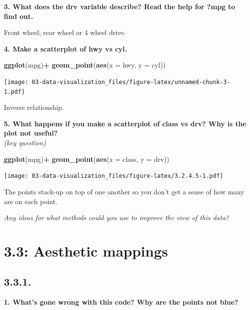 \documentclass[]{book}
\newenvironment{Shaded}{\begin{snugshade}}{\end{snugshade}}
\newcommand{\DataTypeTok}[1]{\textcolor[rgb]{0.13,0.29,0.53}{#1}}
\newcommand{\KeywordTok}[1]{\textcolor[rgb]{0.13,0.29,0.53}{\textbf{#1}}}
\newcommand{\NormalTok}[1]{#1}
\newcommand{\OperatorTok}[1]{\textcolor[rgb]{0.81,0.36,0.00}{\textbf{#1}}}
\newcommand{\StringTok}[1]{\textcolor[rgb]{0.31,0.60,0.02}{#1}}
\theoremstyle{definition}
\theoremstyle{definition}
\theoremstyle{definition}
\theoremstyle{remark}
\begin{document}
\textbf{3. What does the drv variable describe? Read the help for ?mpg
to find out.}

Front wheel, rear wheel or 4 wheel drive.

\textbf{4. Make a scatterplot of hwy vs cyl.}

\begin{Shaded}
\begin{Highlighting}[]
\KeywordTok{ggplot}\NormalTok{(mpg)}\OperatorTok{+}
\StringTok{  }\KeywordTok{geom_point}\NormalTok{(}\KeywordTok{aes}\NormalTok{(}\DataTypeTok{x =}\NormalTok{ hwy, }\DataTypeTok{y =}\NormalTok{ cyl))}
\end{Highlighting}
\end{Shaded}

\texttt{[image: 03-data-visualization\_files/figure-latex/unnamed-chunk-3-1.pdf]}

Inverse relationship.

\textbf{5. What happens if you make a scatterplot of class vs drv? Why
is the plot not useful?}\\
\emph{(key question)}

\begin{Shaded}
\begin{Highlighting}[]
\KeywordTok{ggplot}\NormalTok{(mpg)}\OperatorTok{+}
\StringTok{  }\KeywordTok{geom_point}\NormalTok{(}\KeywordTok{aes}\NormalTok{(}\DataTypeTok{x =}\NormalTok{ class, }\DataTypeTok{y =}\NormalTok{ drv))}
\end{Highlighting}
\end{Shaded}

\texttt{[image: 03-data-visualization\_files/figure-latex/3.2.4.5-1.pdf]}

The points stack-up on top of one another so you don't get a sense of
how many are on each point.

\emph{Any ideas for what methods could you use to improve the view of
this data?}

\hypertarget{aesthetic-mappings}{%
\section{3.3: Aesthetic mappings}\label{aesthetic-mappings}}

\hypertarget{section-1}{%
\subsection{3.3.1.}\label{section-1}}

\textbf{1. What's gone wrong with this code? Why are the points not
blue?}
\end{document}

